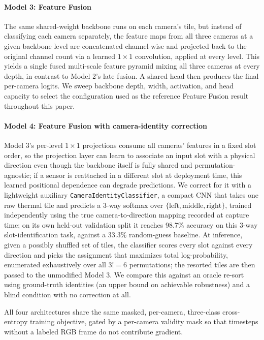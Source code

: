 \paragraph{Model 3: Feature Fusion} The same shared-weight backbone runs on each camera's tile, but instead of classifying each camera separately, the feature maps from all three cameras at a given backbone level are concatenated channel-wise and projected back to the original channel count via a learned $1\times1$ convolution, applied at every level. This yields a single fused multi-scale feature pyramid mixing all three cameras at every depth, in contrast to Model 2's late fusion. A shared head then produces the final per-camera logits. We sweep backbone depth, width, activation, and head capacity to select the configuration used as the reference Feature Fusion result throughout this paper.

\paragraph{Model 4: Feature Fusion with camera-identity correction} Model 3's per-level $1\times1$ projections consume all cameras' features in a fixed slot order, so the projection layer can learn to associate an input slot with a physical direction even though the backbone itself is fully shared and permutation-agnostic; if a sensor is reattached in a different slot at deployment time, this learned positional dependence can degrade predictions. We correct for it with a lightweight auxiliary \texttt{CameraIdentityClassifier}, a compact CNN that takes one raw thermal tile and predicts a 3-way softmax over $\{\text{left}, \text{middle}, \text{right}\}$, trained independently using the true camera-to-direction mapping recorded at capture time; on its own held-out validation split it reaches 98.7\% accuracy on this 3-way slot-identification task, against a 33.3\% random-guess baseline. At inference, given a possibly shuffled set of tiles, the classifier scores every slot against every direction and picks the assignment that maximizes total log-probability, enumerated exhaustively over all $3! = 6$ permutations; the resorted tiles are then passed to the unmodified Model 3. We compare this against an oracle re-sort using ground-truth identities (an upper bound on achievable robustness) and a blind condition with no correction at all.

All four architectures share the same masked, per-camera, three-class cross-entropy training objective, gated by a per-camera validity mask so that timesteps without a labeled RGB frame do not contribute gradient.